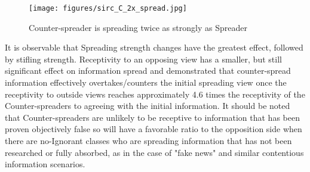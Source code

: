\begin{figure}[!htbp]
  \texttt{[image: figures/sirc\_C\_2x\_spread.jpg]}
  \caption{Counter-spreader is spreading twice as strongly as Spreader}
  \label{fig:sirc_C_2x_spread}
\end{figure}

It is observable that Spreading strength changes have the greatest effect, followed by stifling strength. Receptivity to an opposing view has a smaller, but still significant effect on information spread and demonstrated that counter-spread information effectively overtakes/counters the initial spreading view once the receptivity to outside views reaches approximately 4.6 times the receptivity of the Counter-spreaders to agreeing with the initial information. It should be noted that Counter-spreaders are unlikely to be receptive to information that has been proven objectively false so will have a favorable ratio to the opposition side when there are no-Ignorant classes who are spreading information that has not been researched or fully absorbed, as in the case of "fake news" and similar contentious information scenarios.
